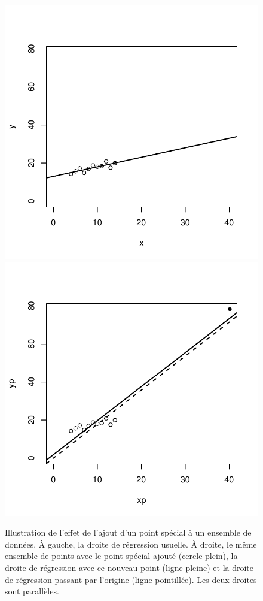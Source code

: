 \begin{solution}{2.10}
    \begin{figure}
\begin{knitrout}
\color{fgcolor}

{\centering \includegraphics[width=.45\linewidth]{figure/fig-simple-pointmagique-1}
\includegraphics[width=.45\linewidth]{figure/fig-simple-pointmagique-2}

}



\end{knitrout}
      \caption{Illustration de l'effet de l'ajout d'un point spécial à
        un ensemble de données. À gauche, la droite de régression
        usuelle. À droite, le même ensemble de points avec le point
        spécial ajouté (cercle plein), la droite de régression avec ce
        nouveau point (ligne pleine) et la droite de régression
        passant par l'origine (ligne pointillée). Les deux droites
        sont parallèles.}
      \label{fig:simple:pointmagique}
    \end{figure}
  
\end{solution}

